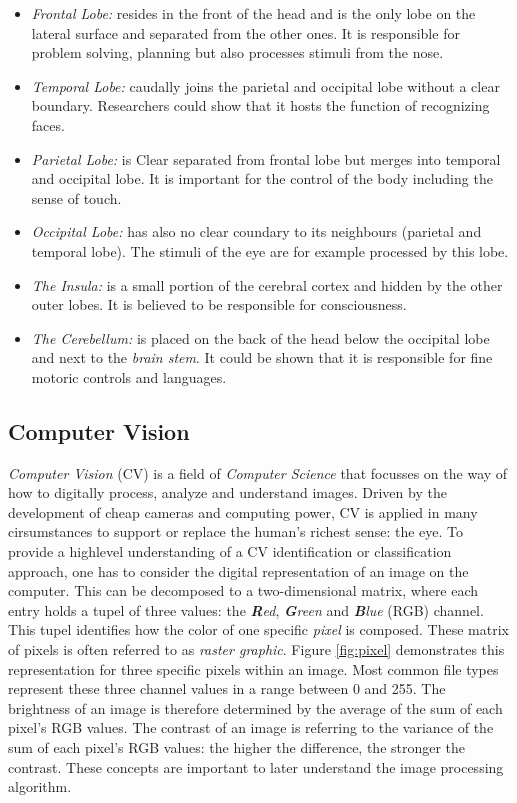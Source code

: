 \documentclass[twoside,11pt]{article}
\begin{document}
\begin{itemize}
	\item \textit{Frontal Lobe:} resides in the front of the head and is the only lobe on the lateral surface and separated from the other ones. It is responsible for problem solving, planning but also processes stimuli from the nose. 
	\item \textit{Temporal Lobe:} caudally joins the parietal and occipital lobe without a clear boundary. Researchers could show that it hosts the function of recognizing faces.
	\item \textit{Parietal Lobe:} is Clear separated from frontal lobe but merges into temporal and occipital lobe. It is important for the control of the body including the sense of touch.
	\item \textit{Occipital Lobe:} has also no clear coundary to its neighbours (parietal and temporal lobe). The stimuli of the eye are for example processed by this lobe.
	\item \textit{The Insula:} is a small portion of the cerebral cortex and hidden by the other outer lobes. It is believed to be responsible for  consciousness.
	\item \textit{The Cerebellum:} is placed on the back of the head below the occipital lobe and next to the \textit{brain stem}. It could be shown that it is responsible for fine motoric controls and languages.
\end{itemize}
\citep{duvernoy2012human}

\subsection{Computer Vision}
\label{cv}
\textit{Computer Vision} (CV) is a field of \textit{Computer Science} that focusses on the way of how to digitally process, analyze and understand images. Driven by the development of cheap cameras and computing power, CV is applied in many cirsumstances to support or replace the human's richest sense: the eye.
To provide a highlevel understanding of a CV identification or classification approach, one has to consider the digital representation of an image on the computer. This can be decomposed to a two-dimensional matrix, where each entry holds a tupel of three values: the \textit{\textbf{R}ed}, \textit{\textbf{G}reen} and \textit{\textbf{B}lue} (RGB) channel. This tupel identifies how the color of one specific \textit{pixel} is composed. These matrix of pixels is often referred to as \textit{raster graphic}. Figure \ref{fig:pixel} demonstrates this representation for three specific pixels within an image. Most common file types represent these three channel values  in a range between 0 and 255. The brightness of an image is therefore determined by the average of the sum of each pixel's RGB values. The contrast of an image is referring to the variance of the sum of each pixel's RGB values: the higher the difference, the stronger the contrast. These concepts are important to later understand the image processing algorithm.
\end{document}
